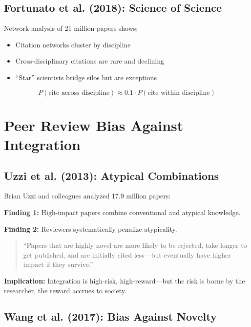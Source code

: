 \subsection{Fortunato et al. (2018): Science of Science}

Network analysis of 21 million papers shows:
\begin{itemize}
\item Citation networks cluster by discipline
\item Cross-disciplinary citations are rare and declining
\item ``Star'' scientists bridge silos but are exceptions
\end{itemize}

\begin{equation}
P(\text{cite across discipline}) \approx 0.1 \cdot P(\text{cite within discipline})
\end{equation}



\section{Peer Review Bias Against Integration}
\label{sec:meta-peer-review}

\subsection{Uzzi et al. (2013): Atypical Combinations}

Brian Uzzi and colleagues analyzed 17.9 million papers:

\textbf{Finding 1:} High-impact papers combine conventional and atypical knowledge.

\textbf{Finding 2:} Reviewers systematically penalize atypicality.

\begin{quote}
``Papers that are highly novel are more likely to be rejected, take longer to get published, and are initially cited less—but eventually have higher impact if they survive.''
\end{quote}

\textbf{Implication:} Integration is high-risk, high-reward—but the risk is borne by the researcher, the reward accrues to society.

\subsection{Wang et al. (2017): Bias Against Novelty}

